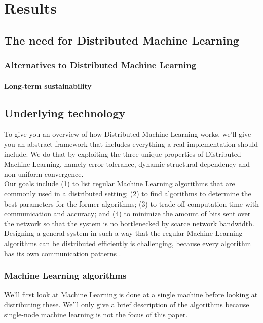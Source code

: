 \section{Results}

\subsection{The need for Distributed Machine Learning}
\subsubsection{Alternatives to Distributed Machine Learning}
\paragraph{Long-term sustainability}










\subsection{Underlying technology}
To give you an overview of how Distributed Machine Learning works, we'll give you an abstract framework that includes everything a real implementation should include. We do that by exploiting the three unique properties of Distributed Machine Learning, namely error tolerance, dynamic structural dependency and non-uniform convergence.\cite{Xing16}\\
Our goals include (1) to list regular Machine Learning algorithms that are commonly used in a distributed setting; (2) to find algorithms to determine the best parameters for the former algorithms; (3) to trade-off computation time with communication and accuracy; and (4) to minimize the amount of bits sent over the network so that the system is no bottlenecked by scarce network bandwidth.\\
Designing a general system in such a way that the regular Machine Learning algorithms can be distributed efficiently is challenging, because every algorithm has its own communication patterns \cite{Jia14}\cite{Newman09}\cite{Rich13}\cite{Smola10}\cite{Takac13}\cite{Tsi12}.

\subsubsection{Machine Learning algorithms}
We'll first look at Machine Learning is done at a single machine before looking at distributing these. We'll only give a brief description of the algorithms because single-node machine learning is not the focus of this paper.


